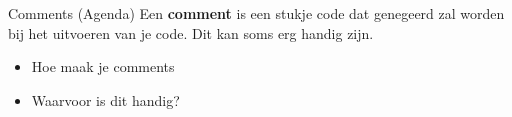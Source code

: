 \begin{frame}[fragile]{Comments (Agenda)}
    Een \textbf{comment} is een stukje code dat genegeerd zal worden bij het uitvoeren van je code. 
    Dit kan soms erg handig zijn. 

    \begin{itemize}[label={\textbullet}]
        \pause 
        \item Hoe maak je comments 
        \item Waarvoor is dit handig?
    \end{itemize}
\end{frame}